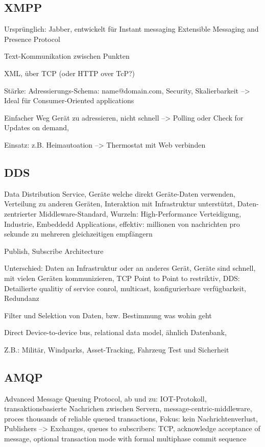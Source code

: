 \subsection{XMPP}
Ursprünglich: Jabber, entwickelt für Instant messaging
Extensible Messaging and Presence Protocol

Text-Kommunikation zwischen Punkten

XML, über TCP (oder HTTP over TcP?)

Stärke: Adressierungs-Schema: name@domain.com, Security, Skalierbarkeit 
--> Ideal für Consumer-Oriented applications

Einfacher Weg Gerät zu adressieren, nicht schnell --> Polling oder Check for Updates on demand, 

Einsatz: z.B. Heimautoation --> Thermostat mit Web verbinden


\subsection{DDS}
Data Distribution Service, Geräte welche direkt Geräte-Daten verwenden, Verteilung zu anderen Geräten, Interaktion mit Infrastruktur unterstützt, Daten-zentrierter Middleware-Standard, Wurzeln: High-Performance Verteidigung, Industrie, Embeddedd Applications, effektiv: millionen von nachrichten pro sekunde zu mehreren gleichzeitigen empfängern


Publish, Subscribe Architecture

Unterschied: Daten an Infrastruktur oder an anderes Gerät, Geräte sind schnell, mit vielen Geräten kommunizieren, TCP Point to Point to restriktiv, DDS: Detailierte qualitiy of service conrol, multicast, konfigurierbare verfügbarkeit, Redundanz

Filter und Selektion von Daten, bzw. Bestimmung was wohin geht

Direct Device-to-device bus, relational data model, ähnlich Datenbank, 

Z.B.: Militär, Windparks, Asset-Tracking, Fahrzeug Test und Sicherheit


\subsection{AMQP}
Advanced Message Queuing Protocol, ab und zu: IOT-Protokoll, transaktionsbasierte Nachrichen zwischen Servern, message-centric-middleware, proces thousands of reliable queued transactions, Fokus: kein Nachrichtenverlust, Publishers --> Exchanges, queues to subscribers: TCP, acknowledge acceptance of message, optional transaction mode with formal multiphase commit sequence

